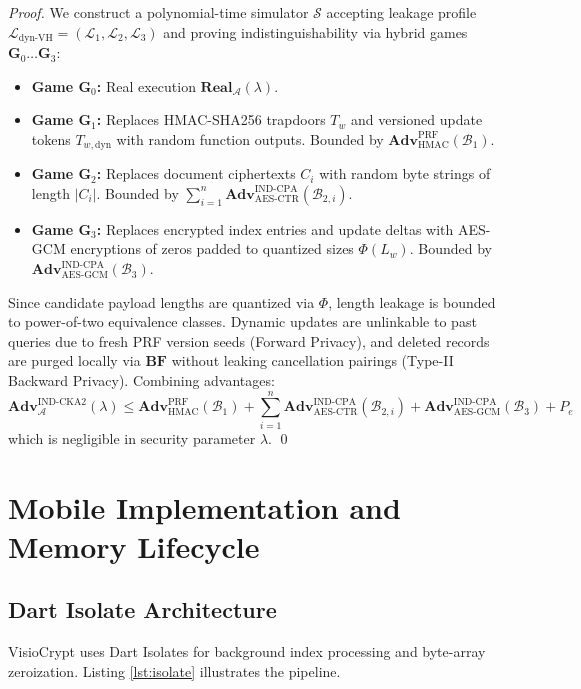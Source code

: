 \documentclass[runningheads]{llncs}
\begin{document}
\begin{proof}
We construct a polynomial-time simulator $\mathcal{S}$ accepting leakage profile $\mathcal{L}_{\text{dyn-VH}} = (\mathcal{L}_1, \mathcal{L}_2, \mathcal{L}_3)$ and proving indistinguishability via hybrid games $\mathbf{G}_0 \dots \mathbf{G}_3$:

\begin{itemize}
    \item \textbf{Game $\mathbf{G}_0$:} Real execution $\mathbf{Real}_{\mathcal{A}}(\lambda)$.
    \item \textbf{Game $\mathbf{G}_1$:} Replaces HMAC-SHA256 trapdoors $T_w$ and versioned update tokens $T_{w,\text{dyn}}$ with random function outputs. Bounded by $\mathbf{Adv}_{\text{HMAC}}^{\text{PRF}}(\mathcal{B}_1)$.
    \item \textbf{Game $\mathbf{G}_2$:} Replaces document ciphertexts $C_i$ with random byte strings of length $|C_i|$. Bounded by $\sum_{i=1}^n \mathbf{Adv}_{\text{AES-CTR}}^{\text{IND-CPA}}(\mathcal{B}_{2,i})$.
    \item \textbf{Game $\mathbf{G}_3$:} Replaces encrypted index entries and update deltas with AES-GCM encryptions of zeros padded to quantized sizes $\Phi(L_w)$. Bounded by $\mathbf{Adv}_{\text{AES-GCM}}^{\text{IND-CPA}}(\mathcal{B}_3)$.
\end{itemize}

Since candidate payload lengths are quantized via $\Phi$, length leakage is bounded to power-of-two equivalence classes. Dynamic updates are unlinkable to past queries due to fresh PRF version seeds (Forward Privacy), and deleted records are purged locally via $\mathbf{BF}$ without leaking cancellation pairings (Type-II Backward Privacy). Combining advantages:
\begin{equation}
\mathbf{Adv}_{\mathcal{A}}^{\text{IND-CKA2}}(\lambda) \leq \mathbf{Adv}_{\text{HMAC}}^{\text{PRF}}(\mathcal{B}_1) + \sum_{i=1}^n \mathbf{Adv}_{\text{AES-CTR}}^{\text{IND-CPA}}(\mathcal{B}_{2,i}) + \mathbf{Adv}_{\text{AES-GCM}}^{\text{IND-CPA}}(\mathcal{B}_3) + P_e
\end{equation}
which is negligible in security parameter $\lambda$. \qed
\end{proof}

\section{Mobile Implementation and Memory Lifecycle}

\subsection{Dart Isolate Architecture}
VisioCrypt uses Dart Isolates for background index processing and byte-array zeroization. Listing \ref{lst:isolate} illustrates the pipeline.
\end{document}
